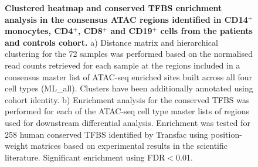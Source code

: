 \begin{figure}[H]
\caption[Clustered heatmap and conserved TFBS enrichment analysis in the consensus ATAC-seq regions identified in CD14$^+$ monocytes, CD4$^+$, CD8$^+$ and CD19$^+$ cells from the patients and controls cohort.]{\textbf{Clustered heatmap and conserved TFBS enrichment analysis in the consensus ATAC regions identified in CD14$^+$ monocytes, CD4$^+$, CD8$^+$ and CD19$^+$ cells from the patients and controls cohort.} a) Distance matrix and hierarchical clustering for the 72 samples was performed based on the normalised read counts retrieved for each sample at the regions included in a consensus master list of ATAC-seq enriched sites built across all four cell types (ML\_all). Clusters have been additionally annotated using cohort identity. b) Enrichment analysis for the conserved TFBS was performed for each of the ATAC-seq cell type master lists of regions used for downstream differential analysis. Enrichment was tested for 258 human conserved TFBS identified by Transfac using position-weight matrices based on experimental results in the scientific literature. Significant enrichment using FDR$<$0.01.}
\label{figure:ATAC_PS_CTL_heatmap_TFBS}
\end{figure}


